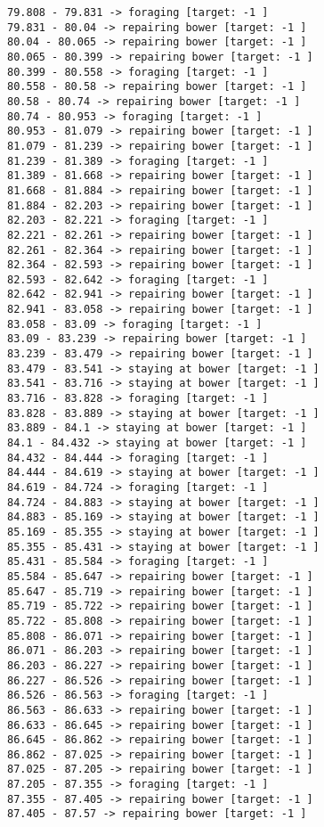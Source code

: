 \documentclass[11pt]{article}
\begin{document}
\begin{Verbatim}[commandchars=\\\{\}]
79.808 - 79.831 -> foraging [target: -1 ]
79.831 - 80.04 -> repairing bower [target: -1 ]
80.04 - 80.065 -> repairing bower [target: -1 ]
80.065 - 80.399 -> repairing bower [target: -1 ]
80.399 - 80.558 -> foraging [target: -1 ]
80.558 - 80.58 -> repairing bower [target: -1 ]
80.58 - 80.74 -> repairing bower [target: -1 ]
80.74 - 80.953 -> foraging [target: -1 ]
80.953 - 81.079 -> repairing bower [target: -1 ]
81.079 - 81.239 -> repairing bower [target: -1 ]
81.239 - 81.389 -> foraging [target: -1 ]
81.389 - 81.668 -> repairing bower [target: -1 ]
81.668 - 81.884 -> repairing bower [target: -1 ]
81.884 - 82.203 -> repairing bower [target: -1 ]
82.203 - 82.221 -> foraging [target: -1 ]
82.221 - 82.261 -> repairing bower [target: -1 ]
82.261 - 82.364 -> repairing bower [target: -1 ]
82.364 - 82.593 -> repairing bower [target: -1 ]
82.593 - 82.642 -> foraging [target: -1 ]
82.642 - 82.941 -> repairing bower [target: -1 ]
82.941 - 83.058 -> repairing bower [target: -1 ]
83.058 - 83.09 -> foraging [target: -1 ]
83.09 - 83.239 -> repairing bower [target: -1 ]
83.239 - 83.479 -> repairing bower [target: -1 ]
83.479 - 83.541 -> staying at bower [target: -1 ]
83.541 - 83.716 -> staying at bower [target: -1 ]
83.716 - 83.828 -> foraging [target: -1 ]
83.828 - 83.889 -> staying at bower [target: -1 ]
83.889 - 84.1 -> staying at bower [target: -1 ]
84.1 - 84.432 -> staying at bower [target: -1 ]
84.432 - 84.444 -> foraging [target: -1 ]
84.444 - 84.619 -> staying at bower [target: -1 ]
84.619 - 84.724 -> foraging [target: -1 ]
84.724 - 84.883 -> staying at bower [target: -1 ]
84.883 - 85.169 -> staying at bower [target: -1 ]
85.169 - 85.355 -> staying at bower [target: -1 ]
85.355 - 85.431 -> staying at bower [target: -1 ]
85.431 - 85.584 -> foraging [target: -1 ]
85.584 - 85.647 -> repairing bower [target: -1 ]
85.647 - 85.719 -> repairing bower [target: -1 ]
85.719 - 85.722 -> repairing bower [target: -1 ]
85.722 - 85.808 -> repairing bower [target: -1 ]
85.808 - 86.071 -> repairing bower [target: -1 ]
86.071 - 86.203 -> repairing bower [target: -1 ]
86.203 - 86.227 -> repairing bower [target: -1 ]
86.227 - 86.526 -> repairing bower [target: -1 ]
86.526 - 86.563 -> foraging [target: -1 ]
86.563 - 86.633 -> repairing bower [target: -1 ]
86.633 - 86.645 -> repairing bower [target: -1 ]
86.645 - 86.862 -> repairing bower [target: -1 ]
86.862 - 87.025 -> repairing bower [target: -1 ]
87.025 - 87.205 -> repairing bower [target: -1 ]
87.205 - 87.355 -> foraging [target: -1 ]
87.355 - 87.405 -> repairing bower [target: -1 ]
87.405 - 87.57 -> repairing bower [target: -1 ]

\end{Verbatim}
\end{document}
